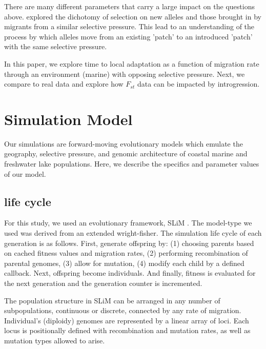\documentclass{article}
\begin{document}
There are many different parameters that carry a large impact on the questions above.
\citet{Ralph2015} 
explored the dichotomy of selection on new alleles and those brought in by migrants from a similar selective pressure.
This lead to an understanding of the process by which alleles move from an existing 'patch' to an introduced 'patch' with the 
same selective pressure. 

In this paper, we explore time to local adaptation as a function of migration rate through an environment (marine) with opposing selective pressure. 
Next, we compare to real data and explore how $F_{st}$ data can be impacted by introgression.


\section{Simulation Model}

Our simulations are forward-moving evolutionary models which
emulate the geography, selective pressure, and genomic architecture 
of coastal marine and freshwater lake populations. 
Here, we describe the specifics and parameter values of our model.

\subsection*{life cycle}

For this study, we used an evolutionary framework, SLiM \citep{Haller2017}.
The model-type we used was derived from an extended wright-fisher. 
The simulation life cycle of each generation is as follows.
First, generate offspring by:
(1) choosing parents based on cached fitness values and migration rates, 
(2) performing recombination of parental genomes, 
(3) allow for mutation, 
(4) modify each child by a defined callback. 
Next, offspring become individuals.
And finally, fitness is evaluated for the next generation
and the generation counter is incremented. 

The population structure in SLiM can be arranged in any number of subpopulations, 
continuous or discrete, connected by any rate of migration. 
Individual's (diploidy) genomes are represented by a linear array of loci. 
Each locus is positionally defined with recombination and mutation rates,
as well as mutation types allowed to arise. 
\end{document}
